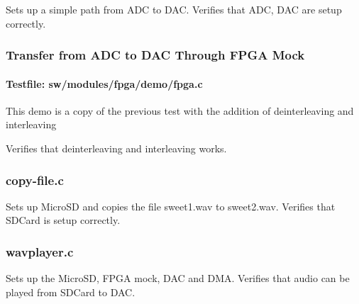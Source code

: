 Sets up a simple path from ADC to DAC.
Verifies that ADC, DAC are setup correctly.

\subsubsection{Transfer from ADC to DAC Through FPGA Mock}
\paragraph{Testfile: sw/modules/fpga/demo/fpga.c}
This demo is a copy of the previous test with the addition of deinterleaving and interleaving


Verifies that deinterleaving and interleaving works.

\subsubsection{copy-file.c}
Sets up MicroSD and copies the file sweet1.wav to sweet2.wav.
Verifies that SDCard is setup correctly.

\subsubsection{wavplayer.c}
Sets up the MicroSD, FPGA mock, DAC and DMA.
Verifies that audio can be played from SDCard to DAC.
